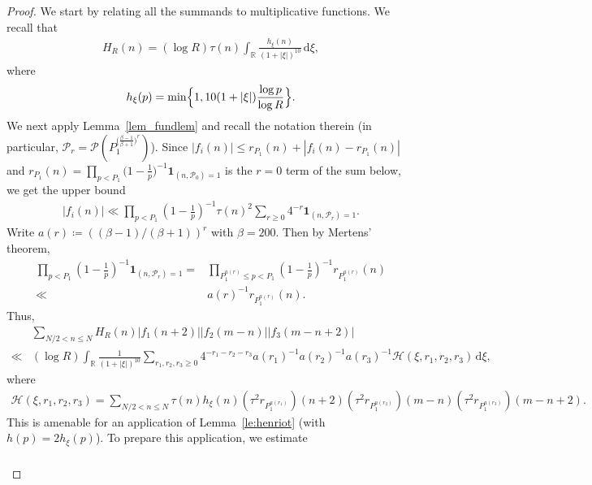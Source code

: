 \documentclass[12pt]{amsart}
\theoremstyle{definition}
\theoremstyle{remark}
\numberwithin{equation}{section}
\newcommand{\1}{\mathbf{1}}
\newcommand{\R}{{\mathbb R}}
\renewcommand\d{\,\mathrm{d}}
\begin{document}
\begin{proof}

We start by relating all the summands to multiplicative functions. We recall that 
    \begin{align}
       H_R(n)= (\log R) \tau(n)\int_{\R}\frac{h_{\xi}(n)}{(1+|\xi|)^{10}} \d \xi,
    \end{align}
where
 \begin{align*}
        h_{\xi}(p)=\min\Bigl\{1,10(1+|\xi|)\frac{\log p}{\log R} \Bigr\}.
    \end{align*}
    We next apply Lemma~\ref{lem_fundlem} and recall the notation therein (in particular, $\mathcal{P}_r=\mathcal{P}(P_1^{\bigl(\frac{\beta-1}{\beta+1}\bigr)^{r}})$). Since $|f_i(n)|\le r_{P_1}(n)+|f_i(n)-r_{P_1}(n)|$ and $r_{P_1}(n)=\prod_{p<P_1}\bigl(1-\frac{1}{p}\bigr)^{-1}\1_{(n,\mathcal{P}_0)=1}$ is the $r=0$ term of the sum below, we get the upper bound
    \begin{align*}
         |f_i(n)|\ll \prod_{p<P_1}\left(1-\frac{1}{p}\right)^{-1} \tau(n)^2 \sum_{r\geq 0}4^{-r}\1_{(n,\mathcal{P}_r)=1}.
    \end{align*}
     Write $a(r)\coloneqq((\beta-1)/(\beta+1))^r$ with $\beta=200$. Then by Mertens' theorem, 
     \begin{align*}
         \prod_{p< P_1}\left(1-\frac{1}{p}\right)^{-1} \1_{(n,\mathcal{P}_r)=1} = &\prod_{P_1^{a(r)}\leq p < P_1} \left(1-\frac{1}{p}\right)^{-1}  r_{P_1^{a(r)}}(n)\\
         \ll & a(r)^{-1} r_{P_1^{a(r)}}(n).
     \end{align*}
     Thus, 
    \begin{align}\label{eq:LQ1}
        \nonumber &\sum_{N/2<n\leq N}H_R(n) |f_
		1(n+2)||f_2(m-n)||f_3(m-n+2)|\\
        \ll &(\log R)  \int_{\R}\frac{1}{(1+|\xi|)^{10}} \sum_{r_1,r_2,r_3 \geq 0} 4^{-r_1-r_2-r_3}a(r_1)^{-1}a(r_2)^{-1}a(r_3)^{-1} \mathcal{H}(\xi,r_1,r_2,r_3) \d \xi, 
    \end{align}
    where
    \begin{align*}
          \mathcal{H}(\xi,r_1,r_2,r_3)=\sum_{N/2<n\leq N} \tau(n)h_{\xi}(n) (\tau^2 r_{P_1^{a(r_1)}})(n+2)(\tau^2 r_{P_1^{a(r_2)}})(m-n)(\tau^2 r_{P_1^{a(r_3)}})(m-n+2).
    \end{align*}
    This is amenable for an application of Lemma~\ref{le:henriot} (with $h(p)=2h_{\xi}(p)$). To prepare this application, we estimate
\begin{align*}\begin{split}

\end{split}
\end{align*}
\end{proof}
\end{document}
